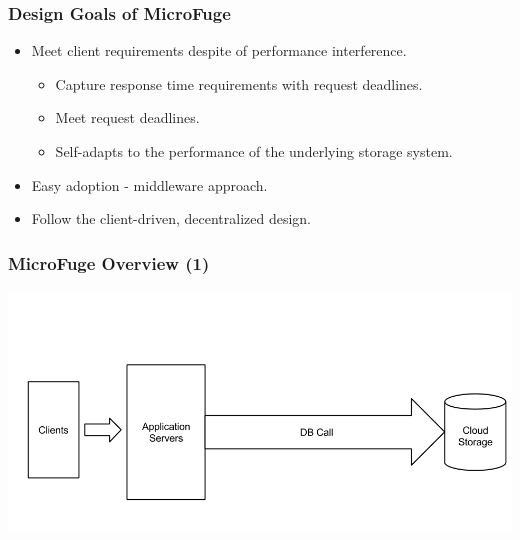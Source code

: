 \documentclass{beamer}
\newcommand{\myv}{\vspace{3 mm}}
\begin{document}


\begin{frame}
  \frametitle{Design Goals of MicroFuge}
  \vspace{-5 mm}
    \begin{itemize}
    \item Meet client requirements despite of performance interference.
      \begin{itemize}
        \myv
      \item Capture response time requirements with request deadlines.
        \myv
      \item Meet request deadlines.
        \myv
      \item Self-adapts to the performance of the underlying storage
        system.
      \end{itemize}
    \myv
    \item Easy adoption - middleware approach.
      \myv
    \item Follow the client-driven, decentralized design.
    \end{itemize}
\end {frame}


\begin{frame}
  \frametitle{MicroFuge Overview (1)}
  \begin{center}
  \includegraphics[scale=0.32]{img/MF_FULL_NEW_1.png}
  \end{center}
\end{frame}
\end{document}
